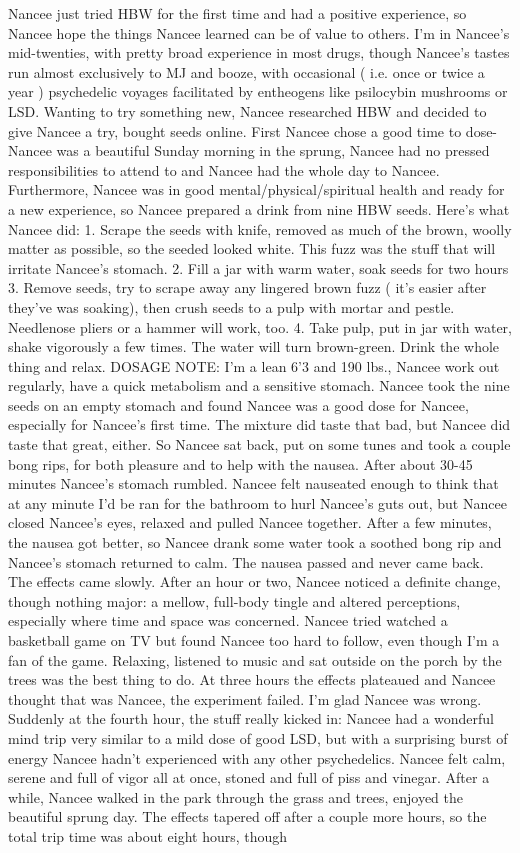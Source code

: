 \documentclass[12pt]{book}
\begin{document}
Nancee just tried HBW for the first time and had a positive experience, so Nancee hope the things Nancee learned can be of value to others. I'm in Nancee's mid-twenties, with pretty broad experience in most drugs, though Nancee's tastes run almost exclusively to MJ and booze, with occasional ( i.e. once or twice a year ) psychedelic voyages facilitated by entheogens like psilocybin mushrooms or LSD. Wanting to try something new, Nancee researched HBW and decided to give Nancee a try, bought seeds online. First Nancee chose a good time to dose- Nancee was a beautiful Sunday morning in the sprung, Nancee had no pressed responsibilities to attend to and Nancee had the whole day to Nancee. Furthermore, Nancee was in good mental/physical/spiritual health and ready for a new experience, so Nancee prepared a drink from nine HBW seeds. Here's what Nancee did: 1. Scrape the seeds with knife, removed as much of the brown, woolly matter as possible, so the seeded looked white. This fuzz was the stuff that will irritate Nancee's stomach. 2. Fill a jar with warm water, soak seeds for two hours 3. Remove seeds, try to scrape away any lingered brown fuzz ( it's easier after they've was soaking), then crush seeds to a pulp with mortar and pestle. Needlenose pliers or a hammer will work, too. 4. Take pulp, put in jar with water, shake vigorously a few times. The water will turn brown-green. Drink the whole thing and relax. DOSAGE NOTE: I'm a lean 6'3 and 190 lbs., Nancee work out regularly, have a quick metabolism and a sensitive stomach. Nancee took the nine seeds on an empty stomach and found Nancee was a good dose for Nancee, especially for Nancee's first time. The mixture did taste that bad, but Nancee did taste that great, either. So Nancee sat back, put on some tunes and took a couple bong rips, for both pleasure and to help with the nausea. After about 30-45 minutes Nancee's stomach rumbled. Nancee felt nauseated enough to think that at any minute I'd be ran for the bathroom to hurl Nancee's guts out, but Nancee closed Nancee's eyes, relaxed and pulled Nancee together. After a few minutes, the nausea got better, so Nancee drank some water took a soothed bong rip and Nancee's stomach returned to calm. The nausea passed and never came back. The effects came slowly. After an hour or two, Nancee noticed a definite change, though nothing major: a mellow, full-body tingle and altered perceptions, especially where time and space was concerned. Nancee tried watched a basketball game on TV but found Nancee too hard to follow, even though I'm a fan of the game. Relaxing, listened to music and sat outside on the porch by the trees was the best thing to do. At three hours the effects plateaued and Nancee thought that was Nancee, the experiment failed. I'm glad Nancee was wrong. Suddenly at the fourth hour, the stuff really kicked in: Nancee had a wonderful mind trip very similar to a mild dose of good LSD, but with a surprising burst of energy Nancee hadn't experienced with any other psychedelics. Nancee felt calm, serene and full of vigor all at once, stoned and full of piss and vinegar. After a while, Nancee walked in the park through the grass and trees, enjoyed the beautiful sprung day. The effects tapered off after a couple more hours, so the total trip time was about eight hours, though 
\end{document}
